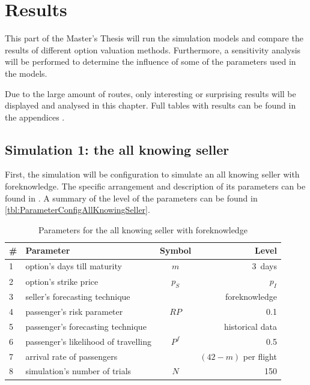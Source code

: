 \chapter{Results}
This part of the Master's Thesis will run the simulation models and compare the results of different option valuation methods. Furthermore, a sensitivity analysis will be performed to determine the influence of some of the parameters used in the models.

Due to the large amount of routes, only interesting or surprising results will be displayed and analysed in this chapter. Full tables with results can be found in the appendices .


\section{Simulation 1: the all knowing seller}
First, the simulation will be configuration to simulate an all knowing seller with foreknowledge. The specific arrangement and description of its parameters can be found in . A summary of the level of the parameters can be found in \autoref{tbl:ParameterConfigAllKnowingSeller}.


\begin{table}
\begin{center}
\begin{tabular}{l l c r}
    \toprule
    \#  & Parameter  &  Symbol  &  Level \\
    \midrule
    1  &  option's days till maturity  &  $m$  & 3~days \\
    2  &  option's strike price  &  $p_S$  &  $p_I$  \\
    3  &  seller's forecasting technique  &  ~  & foreknowledge \\
    4  &  passenger's risk parameter  &  $RP$  &  0.1 \\ 
    5  &  passenger's forecasting technique  &  ~  &  historical data \\
    6  &  passenger's likelihood of travelling  &  $P^f$  &  0.5 \\
    7  &  arrival rate of passengers  &  ~  &  $(42 - m)$ per flight \\
    8  &  simulation's number of trials  &  $N$  &  150 \\
    \bottomrule
\end{tabular}
\caption{Parameters for the all knowing seller with foreknowledge}
\label{tbl:ParameterConfigAllKnowingSeller}
\end{center}
\end{table}



